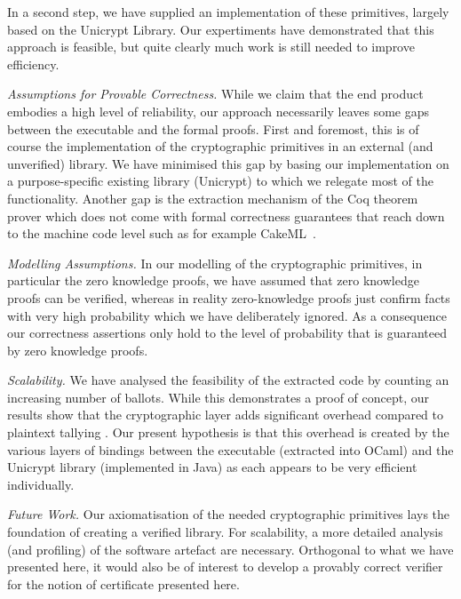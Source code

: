 \documentclass{llncs}
\begin{document}
In a second step, we have supplied an implementation of these
primitives, largely based on the Unicrypt Library. Our expertiments
have demonstrated that this approach is feasible, but quite clearly
much work is still needed to improve efficiency. 

\smallskip\noindent\emph{Assumptions for Provable Correctness.}
While we claim that the end product embodies a high level of
reliability, our approach necessarily leaves some gaps between the
executable and the formal proofs. First and foremost, this is of
course the implementation of the cryptographic primitives in an
external (and unverified) library. We have minimised this gap by
basing our implementation on a purpose-specific existing library
(Unicrypt) to which we relegate most of the functionality. Another
gap is the extraction mechanism of the Coq theorem prover which does
not come with formal correctness guarantees that reach down to the
machine code level such as for example CakeML~\cite{Kumar:2014:CVI}.

\smallskip\noindent\emph{Modelling Assumptions.} In our modelling of
the cryptographic primitives, in particular the zero knowledge
proofs, we have assumed that zero knowledge proofs can be verified,
whereas in reality zero-knowledge proofs just confirm facts with
very high probability which we have deliberately  ignored. As a
consequence our correctness assertions only hold to the level
of probability that is guaranteed by zero knowledge proofs.

\smallskip\noindent\emph{Scalability.} We have analysed the
feasibility of the extracted code by counting an increasing number
of ballots. While this demonstrates a proof of concept, our results
show that the cryptographic layer adds significant overhead compared
to plaintext tallying \cite{Pattinson:2017:SVE}.  Our present
hypothesis is that this overhead is created by the various layers of
bindings between the executable (extracted into OCaml) and the
Unicrypt library (implemented in Java) as each appears to be very
efficient individually. 

\smallskip\noindent\emph{Future Work.} Our axiomatisation of the
needed cryptographic primitives lays the foundation of creating a
verified library. For scalability, a more detailed analysis (and
profiling) of the software artefact are necessary. Orthogonal to
what we have presented here, it would also be of interest to develop
a provably correct verifier for the notion of certificate presented
here. 



\end{document}
